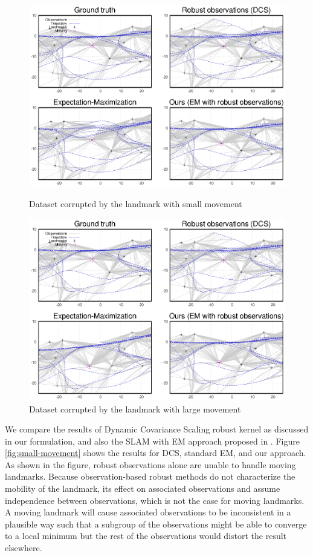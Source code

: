 \begin{figure}[ht]
\centering
\begin{minipage}[b]{0.48\textwidth}
  \includegraphics[width=\textwidth]{fig/small-movement}
  \caption{Dataset corrupted by the landmark with small movement}
  \label{fig:small-movement}
\end{minipage}
\quad
\begin{minipage}[b]{0.48\textwidth}
  \includegraphics[width=\textwidth]{fig/large-movement}
  \caption{Dataset corrupted by the landmark with large movement}
  \label{fig:large-movement}
\end{minipage}
\end{figure}

We compare the results of Dynamic Covariance Scaling robust kernel as discussed in our
formulation, and also the SLAM with EM approach proposed in \cite{rogers2010slam}.  Figure \ref{fig:small-movement} shows the results for DCS, standard EM, and our
approach. As shown in the figure, robust observations alone are unable to
handle moving landmarks. Because observation-based robust methods do
not characterize the mobility of the landmark, its effect on associated
observations and assume independence between observations, which is not the case for moving landmarks. A moving landmark will cause associated observations to
be inconsistent in a plausible way such that a subgroup of the observations
might be able to converge to a local minimum but the rest of the observations
would distort the result elsewhere. 

